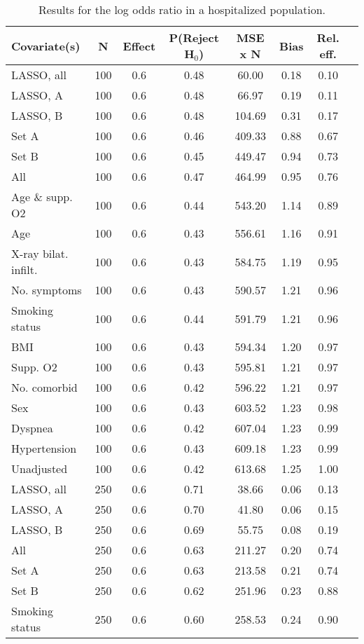 \documentclass{article}
\begin{document}
{\tabcolsep=6pt  %
\begin{longtable}{lccccccc}
\caption{Results for the log odds ratio in a hospitalized population.}\label{tab15}\\
Covariate(s) & N & Effect & P(Reject H$_0$) & MSE x N & Bias & Rel. eff.\\ \midrule
LASSO, all & 100 & 0.6 & 0.48 & 60.00 & 0.18 & 0.10\\
LASSO, A & 100 & 0.6 & 0.48 & 66.97 & 0.19 & 0.11\\
LASSO, B & 100 & 0.6 & 0.48 & 104.69 & 0.31 & 0.17\\
Set A & 100 & 0.6 & 0.46 & 409.33 & 0.88 & 0.67\\
Set B & 100 & 0.6 & 0.45 & 449.47 & 0.94 & 0.73\\
All & 100 & 0.6 & 0.47 & 464.99 & 0.95 & 0.76\\
Age \& supp. O2 & 100 & 0.6 & 0.44 & 543.20 & 1.14 & 0.89\\
Age & 100 & 0.6 & 0.43 & 556.61 & 1.16 & 0.91\\
X-ray bilat. infilt. & 100 & 0.6 & 0.43 & 584.75 & 1.19 & 0.95\\
No. symptoms & 100 & 0.6 & 0.43 & 590.57 & 1.21 & 0.96\\
Smoking status & 100 & 0.6 & 0.44 & 591.79 & 1.21 & 0.96\\
BMI & 100 & 0.6 & 0.43 & 594.34 & 1.20 & 0.97\\
Supp. O2 & 100 & 0.6 & 0.43 & 595.81 & 1.21 & 0.97\\
No. comorbid & 100 & 0.6 & 0.42 & 596.22 & 1.21 & 0.97\\
Sex & 100 & 0.6 & 0.43 & 603.52 & 1.23 & 0.98\\
Dyspnea & 100 & 0.6 & 0.42 & 607.04 & 1.23 & 0.99\\
Hypertension & 100 & 0.6 & 0.43 & 609.18 & 1.23 & 0.99\\
Unadjusted & 100 & 0.6 & 0.42 & 613.68 & 1.25 & 1.00\\ \midrule
LASSO, all & 250 & 0.6 & 0.71 & 38.66 & 0.06 & 0.13\\
LASSO, A & 250 & 0.6 & 0.70 & 41.80 & 0.06 & 0.15\\
LASSO, B & 250 & 0.6 & 0.69 & 55.75 & 0.08 & 0.19\\
All & 250 & 0.6 & 0.63 & 211.27 & 0.20 & 0.74\\
Set A & 250 & 0.6 & 0.63 & 213.58 & 0.21 & 0.74\\
Set B & 250 & 0.6 & 0.62 & 251.96 & 0.23 & 0.88\\
Smoking status & 250 & 0.6 & 0.60 & 258.53 & 0.24 & 0.90\\

\end{longtable}}
\end{document}
